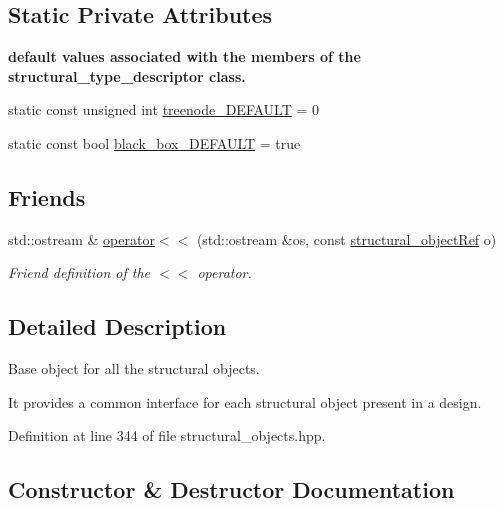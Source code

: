 \subsection*{Static Private Attributes}
\begin{Indent}\textbf{ default values associated with the members of the structural\+\_\+type\+\_\+descriptor class.}\par
\begin{DoxyCompactItemize}
\item 
static const unsigned int \hyperlink{classstructural__object_a6db33090a23013b99dc89c70a93aef46}{treenode\+\_\+\+D\+E\+F\+A\+U\+LT} = 0
\item 
static const bool \hyperlink{classstructural__object_a4a659fd0650644dfaab84e5c297af4b2}{black\+\_\+box\+\_\+\+D\+E\+F\+A\+U\+LT} = true
\end{DoxyCompactItemize}
\end{Indent}
\subsection*{Friends}
\begin{DoxyCompactItemize}
\item 
std\+::ostream \& \hyperlink{classstructural__object_a8e2edcd5aaf72ad547d05b0207774667}{operator$<$$<$} (std\+::ostream \&os, const \hyperlink{structural__objects_8hpp_a8ea5f8cc50ab8f4c31e2751074ff60b2}{structural\+\_\+object\+Ref} o)
\begin{DoxyCompactList}\small\item\em Friend definition of the $<$$<$ operator. \end{DoxyCompactList}\end{DoxyCompactItemize}


\subsection{Detailed Description}
Base object for all the structural objects. 

It provides a common interface for each structural object present in a design. 

Definition at line 344 of file structural\+\_\+objects.\+hpp.



\subsection{Constructor \& Destructor Documentation}
\mbox{\label{classstructural__object_a28c605699d1923f66549bd42a62d6046}} 

